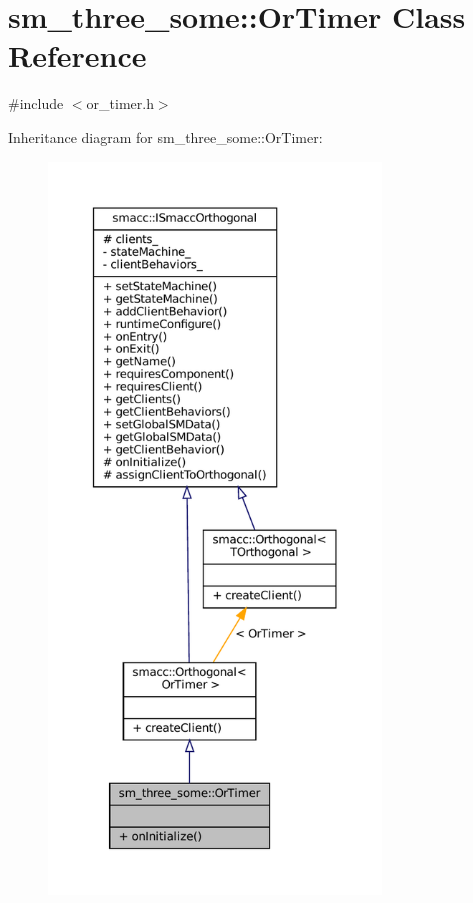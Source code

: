 \hypertarget{classsm__three__some_1_1OrTimer}{}\section{sm\+\_\+three\+\_\+some\+:\+:Or\+Timer Class Reference}
\label{classsm__three__some_1_1OrTimer}


{\ttfamily \#include $<$or\+\_\+timer.\+h$>$}



Inheritance diagram for sm\+\_\+three\+\_\+some\+:\+:Or\+Timer\+:
\nopagebreak
\begin{figure}[H]
\begin{center}
\leavevmode
\includegraphics[height=550pt]{classsm__three__some_1_1OrTimer__inherit__graph}
\end{center}
\end{figure}


